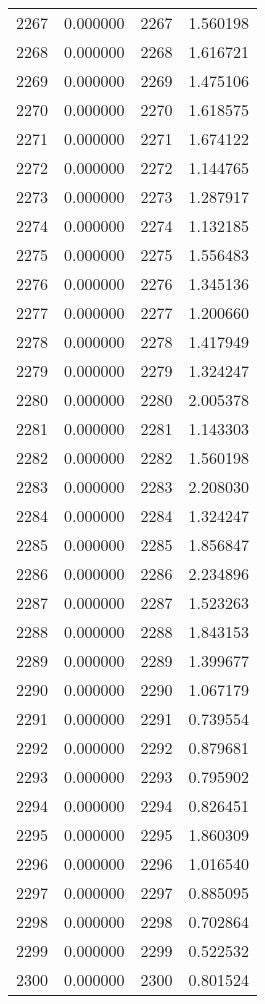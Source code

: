 \documentclass[12pt]{article}
\begin{document}
\begin{longtable}{@{}cccc@{}}
2267 & 0.000000 & 2267 & 1.560198 \\
2268 & 0.000000 & 2268 & 1.616721 \\
2269 & 0.000000 & 2269 & 1.475106 \\
2270 & 0.000000 & 2270 & 1.618575 \\
2271 & 0.000000 & 2271 & 1.674122 \\
2272 & 0.000000 & 2272 & 1.144765 \\
2273 & 0.000000 & 2273 & 1.287917 \\
2274 & 0.000000 & 2274 & 1.132185 \\
2275 & 0.000000 & 2275 & 1.556483 \\
2276 & 0.000000 & 2276 & 1.345136 \\
2277 & 0.000000 & 2277 & 1.200660 \\
2278 & 0.000000 & 2278 & 1.417949 \\
2279 & 0.000000 & 2279 & 1.324247 \\
2280 & 0.000000 & 2280 & 2.005378 \\
2281 & 0.000000 & 2281 & 1.143303 \\
2282 & 0.000000 & 2282 & 1.560198 \\
2283 & 0.000000 & 2283 & 2.208030 \\
2284 & 0.000000 & 2284 & 1.324247 \\
2285 & 0.000000 & 2285 & 1.856847 \\
2286 & 0.000000 & 2286 & 2.234896 \\
2287 & 0.000000 & 2287 & 1.523263 \\
2288 & 0.000000 & 2288 & 1.843153 \\
2289 & 0.000000 & 2289 & 1.399677 \\
2290 & 0.000000 & 2290 & 1.067179 \\
2291 & 0.000000 & 2291 & 0.739554 \\
2292 & 0.000000 & 2292 & 0.879681 \\
2293 & 0.000000 & 2293 & 0.795902 \\
2294 & 0.000000 & 2294 & 0.826451 \\
2295 & 0.000000 & 2295 & 1.860309 \\
2296 & 0.000000 & 2296 & 1.016540 \\
2297 & 0.000000 & 2297 & 0.885095 \\
2298 & 0.000000 & 2298 & 0.702864 \\
2299 & 0.000000 & 2299 & 0.522532 \\
2300 & 0.000000 & 2300 & 0.801524 \\

\end{longtable}
\end{document}
